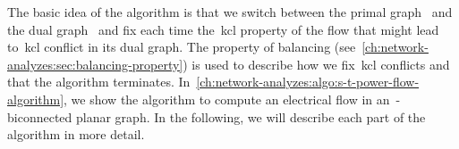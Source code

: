 The basic idea of the algorithm is that we switch between the primal
graph~ and the dual graph~ and fix each
time the~\gls{kcl} property of the flow that might lead to~\gls{kcl} conflict in
its dual graph. The property of balancing
(see~\cref{ch:network-analyzes:sec:balancing-property}) is used to describe how
we fix~\gls{kcl} conflicts and that the algorithm terminates. 
In~\cref{ch:network-analyzes:algo:s-t-power-flow-algorithm}, we show the
algorithm to compute an electrical flow in an~\source-\sink biconnected planar
graph. In the following, we will describe each part of the algorithm in more
detail.
% 
%
\def\HiLi{\leavevmode\rlap{\hbox to \hsize{\color{HiLi}\leaders\hrule
height .9\baselineskip depth 1.3ex\hfill}}}

